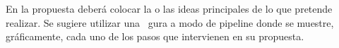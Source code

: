 En la propuesta deberá colocar la o las ideas principales de lo que pretende realizar. Se sugiere utilizar una  gura a modo de pipeline donde se muestre,
gráficamente, cada uno de los pasos que intervienen en su propuesta.
